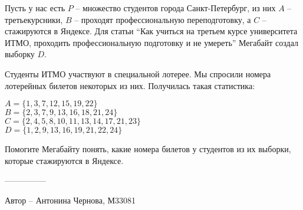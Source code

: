\question
Пусть у нас есть $P$ -- множество студентов города Санкт-Петербург, из них $A$ -- третьекурсники, $B$ -- проходят профессиональную переподготовку, а $C$ -- стажируются в Яндексе. Для статьи “Как учиться на третьем курсе университета ИТМО, проходить профессиональную подготовку и не умереть” Мегабайт создал выборку $D$.

Студенты ИТМО участвуют в специальной лотерее. Мы спросили номера лотерейных билетов некоторых из них. Получилась такая статистика:

\begin{center}
$A = \{1, 3, 7, 12, 15, 19, 22\}$
\\
$B = \{2, 3, 7, 9, 13, 16, 18, 21, 24\}$
\\
$C = \{2, 4, 5, 8, 10, 11, 13, 14, 17, 21, 23\}$
\\
$D = \{1, 2, 9, 13, 16, 19, 21, 22, 24\}$
\end{center}

Помогите Мегабайту понять, какие номера билетов у студентов из их выборки, которые стажируются в Яндексе.

---------------

Автор -- Антонина Чернова, М33081